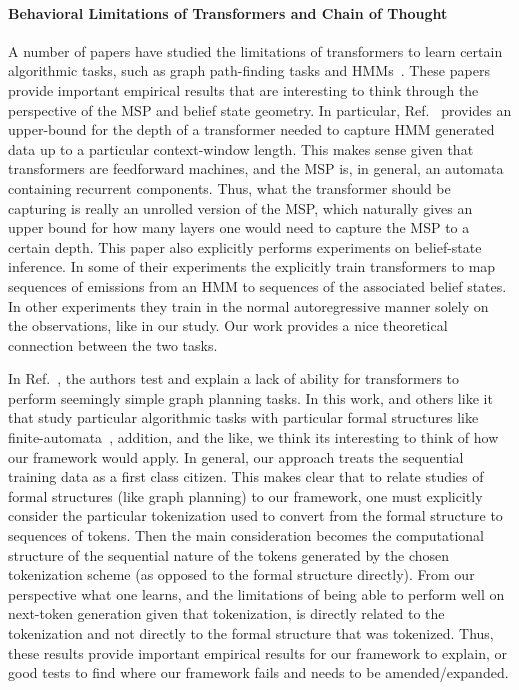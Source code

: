 \documentclass{article}
\begin{document}
\paragraph{Behavioral Limitations of Transformers and Chain of Thought}
A number of papers have studied the limitations of transformers to learn certain algorithmic tasks, such as graph path-finding tasks and HMMs~\cite{bachmann2024pitfalls, hu2024limitation}. These papers provide important empirical results that are interesting to think through the perspective of the MSP and belief state geometry.
In particular, Ref.~\cite{hu2024limitation} provides an upper-bound for the depth of a transformer needed to capture HMM generated data up to a particular context-window length. This makes sense given that transformers are feedforward machines, and the MSP is, in general, an automata containing recurrent components. Thus, what the transformer should be capturing is really an unrolled version of the MSP, which naturally gives an upper bound for how many layers one would need to capture the MSP to a certain depth. This paper also explicitly performs experiments on belief-state inference. In some of their experiments the explicitly train transformers to map sequences of emissions from an HMM to sequences of the associated belief states. In other experiments they train in the normal autoregressive manner solely on the observations, like in our study. Our work provides a nice theoretical connection between the two tasks.

In Ref.~\citep{bachmann2024pitfalls}, the authors test and explain a lack of ability for transformers to perform seemingly simple graph planning tasks. In this work, and others like it that study particular algorithmic tasks with particular formal structures like finite-automata~\cite{liu2022transformers}, addition, and the like, we think its interesting to think of how our framework would apply. In general, our approach treats the sequential training data as a first class citizen. This makes clear that to relate studies of formal structures (like graph planning) to our framework, one must explicitly consider the particular tokenization used to convert from the formal structure to sequences of tokens. Then the main consideration becomes the computational structure of the sequential nature of the tokens generated by the chosen tokenization scheme (as opposed to the formal structure directly). From our perspective what one learns, and the limitations of being able to perform well on next-token generation given that tokenization, is directly related to the tokenization and not directly to the formal structure that was tokenized. Thus, these results provide important empirical results for our framework to explain, or good tests to find where our framework fails and needs to be amended/expanded.
\end{document}

